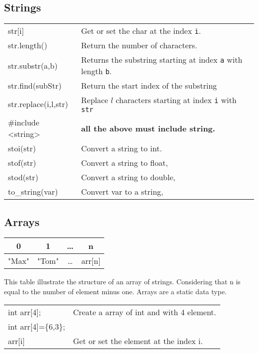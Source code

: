 \documentclass[5pt]{article}
\begin{document}
\begin{multicols}{2}
\subsection{Strings}
\begin{tabular}{>{\ttfamily}l l}
str$[$i$]$          & Get or set the char at the index \texttt{i}.\\
str.length()        & Return the number of characters.\\
str.substr(a,b)     & Returns the substring starting at index \texttt{a} with length \texttt{b}.\\
str.find(subStr)    & Return the start index of the substring\\
str.replace(i,l,str)& Replace $l$ characters starting at index \texttt{i} with \texttt{str}\\
\#include <string>  & \textbf{all the above must include string.}\\
stoi(str)           & Convert a string to int.\\
stof(str)           & Convert a string to float,\\
stod(str)           & Convert a string to double,\\
to\_string(var)     & Convert var to a string,\\
\end{tabular}

\subsection{Arrays}
\begin{tabular}{c|c|c|c }
 0 & 1 & … & n \\ 
 \hline
 "Max" & "Tom" & … & arr$[$n$]$
\end{tabular}
This table illustrate the structure of an array of strings. Considering that n is equal to the number of element minus one. Arrays are a static data type.\\[6pt]
\begin{tabular}{>{\ttfamily}l l}
int arr[4];         & Create a array of int and with 4 element.\\
int arr[4]=\{6,3\}; & \\
arr$[$i$]$          & Get or set the element at the index i.\\
\end{tabular}



\end{multicols}
\end{document}
